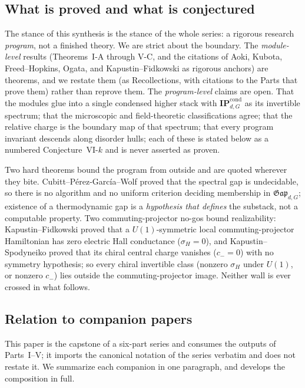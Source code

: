 \documentclass[12pt]{article}
\newcommand{\Gap}{\mathfrak{Gap}}              %
\newcommand{\IPcond}{\mathbf{IP}^{\mathrm{cond}}}  %
\theoremstyle{plain}
\theoremstyle{definition}
\theoremstyle{remark}
\begin{document}
\subsection{What is proved and what is conjectured}
\label{sec:stance}

The stance of this synthesis is the stance of the whole series: a rigorous research
\emph{program}, not a finished theory. We are strict about the boundary. The
\emph{module-level} results (Theorems~I-A through V-C, and the citations of Aoki,
Kubota, Freed--Hopkins, Ogata, and Kapustin--Fidkowski as rigorous anchors) are
theorems, and we restate them (as Recollections, with citations to the Parts that prove
them) rather than reprove them. The \emph{program-level} claims are open. That the
modules glue into a single condensed higher stack with $\IPcond_{d,G}$ as its invertible
spectrum; that the microscopic and field-theoretic classifications agree; that the
relative charge is the boundary map of that spectrum; that every program invariant
descends along disorder hulls; each of these is stated below as a numbered
Conjecture~VI-$k$ and is never asserted as proven.

Two hard theorems bound the program from outside and are quoted wherever they bite.
Cubitt--P\'erez-Garc\'ia--Wolf \cite{cpw-undecidable} proved that the spectral gap is
undecidable, so there is no algorithm and no uniform criterion deciding membership in
$\Gap_{d,G}$; existence of a thermodynamic gap is a \emph{hypothesis that defines} the
substack, not a computable property. Two commuting-projector no-gos bound realizability:
Kapustin--Fidkowski \cite{kapustin-fidkowski} proved that a $U(1)$-symmetric local
commuting-projector Hamiltonian has zero electric Hall conductance ($\sigma_H=0$), and
Kapustin--Spodyneiko \cite{kapustin-spodyneiko-thermal} proved that its chiral central charge
vanishes ($c_-=0$) with no symmetry hypothesis; so every chiral invertible class (nonzero
$\sigma_H$ under $U(1)$, or nonzero $c_-$) lies outside the commuting-projector image.
Neither wall is ever crossed in what follows.

\subsection{Relation to companion papers}
\label{sec:companions}

This paper is the capstone of a six-part series and consumes the outputs of Parts~I--V\@;
it imports the canonical notation of the series verbatim and does not restate it. We
summarize each companion in one paragraph, and  develops the
composition in full.
\end{document}
